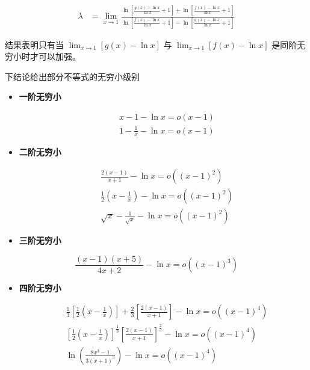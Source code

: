 \documentclass[12pt]{article}
\theoremstyle{definition}
\theoremstyle{plain}
\theoremstyle{definition}
\begin{document}
\begin{align*}
\lambda &= \lim_{x \rightarrow 1}\frac{\ln\left\lbrack \frac{g(x) - \ln x}{\ln x} + 1 \right\rbrack + \ln\left\lbrack \frac{f(x) - \ln x}{\ln x} + 1 \right\rbrack}{\ln\left\lbrack \frac{f(x) - \ln x}{\ln x} + 1 \right\rbrack - \ln\left\lbrack \frac{g(x) - \ln x}{\ln x} + 1 \right\rbrack}
\end{align*}

结果表明只有当
\(\lim_{x \rightarrow 1}\left\lbrack g(x) - \ln x \right\rbrack\) 与
\(\lim_{x \rightarrow 1}\left\lbrack f(x) - \ln x \right\rbrack\)
是同阶无穷小时才可以加强。

下结论给出部分不等式的无穷小级别

\begin{itemize}
    \item \textbf{一阶无穷小}

    \begin{align*}
        & x - 1 - \ln x = o(x - 1) \\
        & 1 - \frac{1}{x} - \ln x = o(x - 1)
    \end{align*}
\end{itemize}

\begin{itemize}
    \item \textbf{二阶无穷小}

    \begin{align*}
        & \frac{2(x - 1)}{x + 1} - \ln x = o((x - 1)^2) \\
        & \frac{1}{2}\left( x - \frac{1}{x} \right) - \ln x = o((x - 1)^2) \\
        & \sqrt{x} - \frac{1}{\sqrt{x}} - \ln x = o((x - 1)^2)
    \end{align*}
\end{itemize}

\begin{itemize}
    \item \textbf{三阶无穷小}
\end{itemize}

\[\frac{(x - 1)(x + 5)}{4x + 2} - \ln x = o((x - 1)^3)\]

\begin{itemize}
    \item \textbf{四阶无穷小}

    \begin{align*}
        & \frac{1}{3}\left[ \frac{1}{2}\left( x - \frac{1}{x} \right) \right] + \frac{2}{3}\left[ \frac{2(x - 1)}{x + 1} \right] - \ln x = o((x - 1)^4) \\
        & \left[ \frac{1}{2}\left( x - \frac{1}{x} \right) \right]^{\frac{1}{3}} \left[ \frac{2(x - 1)}{x + 1} \right]^{\frac{2}{3}} - \ln x = o((x - 1)^4) \\
        & \ln\left( \frac{8x^{3} - 1}{3(x + 1)^{3}} \right) - \ln x = o((x - 1)^4)
    \end{align*}
\end{itemize}
\end{document}

